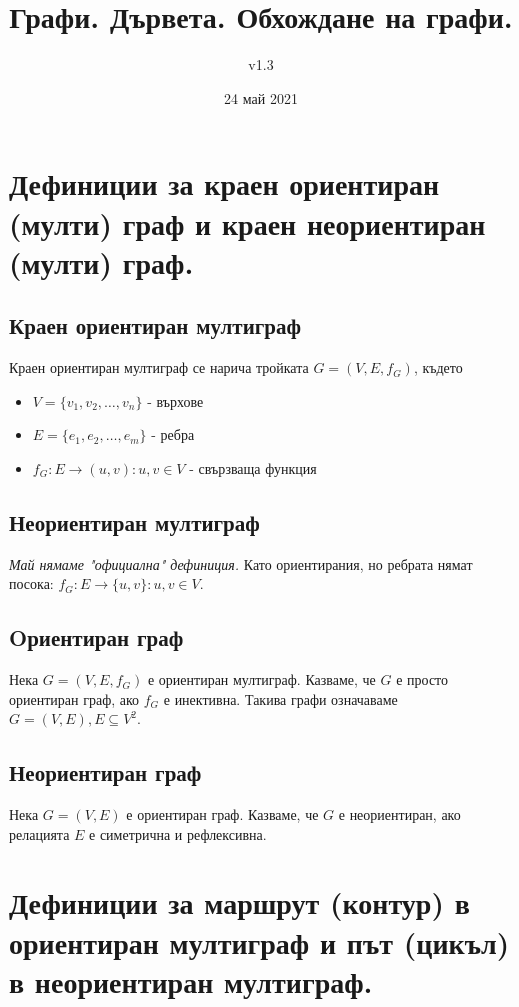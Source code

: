 \documentclass[fleqn,12pt]{article}
\title{Графи. Дървета. Обхождане на графи.}
\author{v1.3}
\date{24 май 2021}
\begin{document}
\maketitle

\tableofcontents

\begin{flushleft}

\section{Дефиниции за краен ориентиран (мулти) граф и краен неориентиран (мулти) граф.}
\subsection{Краен ориентиран мултиграф}
Краен ориентиран мултиграф се нарича тройката $G = (V, E, f_G)$, където
\begin{itemize}
	\item $V = \{ v_1, v_2, \dots, v_n \}$ - върхове
	\item $E = \{ e_1, e_2, \dots, e_m \}$ - ребра
	\item $f_G : E \rightarrow (u,v) : u,v \in V$ - свързваща функция
\end{itemize}

\subsection{Неориентиран мултиграф}
\textit{Май нямаме "официална" дефиниция. } Като ориентирания, но ребрата нямат посока: $f_G : E \rightarrow \{u,v\} : u,v \in V$.

\subsection{Oриентиран граф}
Нека $G = (V, E, f_G)$ е ориентиран мултиграф. Казваме, че $G$ е просто ориентиран граф, ако $f_G$ е инективна. 
Такива графи означаваме $G = (V, E), E \subseteq V^2$.

\subsection{Неориентиран граф}
Нека $G = (V, E)$ е ориентиран граф. Казваме, че $G$ е неориентиран, ако релацията $E$ е симетрична и рефлексивна.

\section{Дефиниции за маршрут (контур) в ориентиран мултиграф и път (цикъл) в неориентиран мултиграф.}

\end{flushleft}
\end{document}
